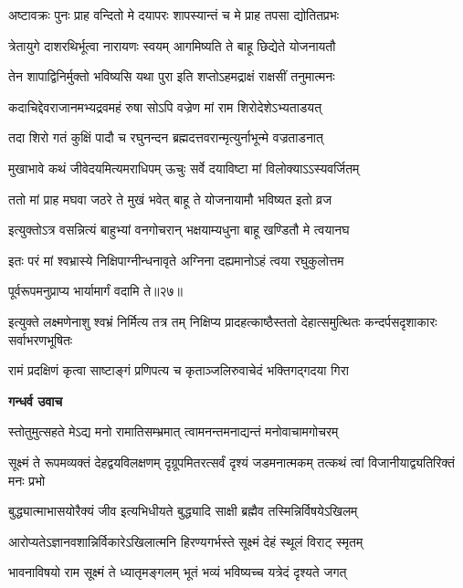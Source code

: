 \twolineshloka
{अष्टावक्रः पुनः प्राह वन्दितो मे दयापरः}
{शापस्यान्तं च मे प्राह तपसा द्योतितप्रभः} %

\twolineshloka
{त्रेतायुगे दाशरथिर्भूत्वा नारायणः स्वयम्}
{आगमिष्यति ते बाहू छिद्येते योजनायतौ} %

\twolineshloka
{तेन शापाद्विनिर्मुक्तो भविष्यसि यथा पुरा}
{इति शप्तोऽहमद्राक्षं राक्षसीं तनुमात्मनः} %

\twolineshloka
{कदाचिद्देवराजानमभ्यद्रवमहं रुषा}
{सोऽपि वज्रेण मां राम शिरोदेशेऽभ्यताडयत्} %

\twolineshloka
{तदा शिरो गतं कुक्षिं पादौ च रघुनन्दन}
{ब्रह्मदत्तवरान्मृत्युर्नाभून्मे वज्रताडनात्} %

\twolineshloka
{मुखाभावे कथं जीवेदयमित्यमराधिपम्}
{ऊचुः सर्वे दयाविष्टा मां विलोक्याऽऽस्यवर्जितम्} %

\twolineshloka
{ततो मां प्राह मघवा जठरे ते मुखं भवेत्}
{बाहू ते योजनायामौ भविष्यत इतो व्रज} %

\twolineshloka
{इत्युक्तोऽत्र वसन्नित्यं बाहुभ्यां वनगोचरान्}
{भक्षयाम्यधुना बाहू खण्डितौ मे त्वयानघ} %

\twolineshloka
{इतः परं मां श्वभ्रास्ये निक्षिपाग्नीन्धनावृते}
{अग्निना दह्यमानोऽहं त्वया रघुकुलोत्तम} %

{पूर्वरूपमनुप्राप्य भार्यामार्गं वदामि ते॥२७॥} %


\threelineshloka
{इत्युक्ते लक्ष्मणेनाशु श्वभ्रं निर्मित्य तत्र तम्}
{निक्षिप्य प्रादहत्काष्ठैस्ततो देहात्समुत्थितः}
{कन्दर्पसदृशाकारः सर्वाभरणभूषितः} %

\twolineshloka
{रामं प्रदक्षिणं कृत्वा साष्टाङ्गं प्रणिपत्य च}
{कृताञ्जलिरुवाचेदं भक्तिगद्गदया गिरा} %

\textbf{गन्धर्व उवाच}

\twolineshloka
{स्तोतुमुत्सहते मेऽद्य मनो रामातिसम्भ्रमात्}
{त्वामनन्तमनाद्यन्तं मनोवाचामगोचरम्} %

\threelineshloka
{सूक्ष्मं ते रूपमव्यक्तं देहद्वयविलक्षणम्}
{दृग्रूपमितरत्सर्वं दृश्यं जडमनात्मकम्}
{तत्कथं त्वां विजानीयाद्व्यतिरिक्तं मनः प्रभो} %

\twolineshloka
{बुद्ध्यात्माभासयोरैक्यं जीव इत्यभिधीयते}
{बुद्ध्यादि साक्षी ब्रह्मैव तस्मिन्निर्विषयेऽखिलम्} %

\twolineshloka
{आरोप्यतेऽज्ञानवशान्निर्विकारेऽखिलात्मनि}
{हिरण्यगर्भस्ते सूक्ष्मं देहं स्थूलं विराट् स्मृतम्} %

\twolineshloka
{भावनाविषयो राम सूक्ष्मं ते ध्यातृमङ्गलम्}
{भूतं भव्यं भविष्यच्च यत्रेदं दृश्यते जगत्} %

